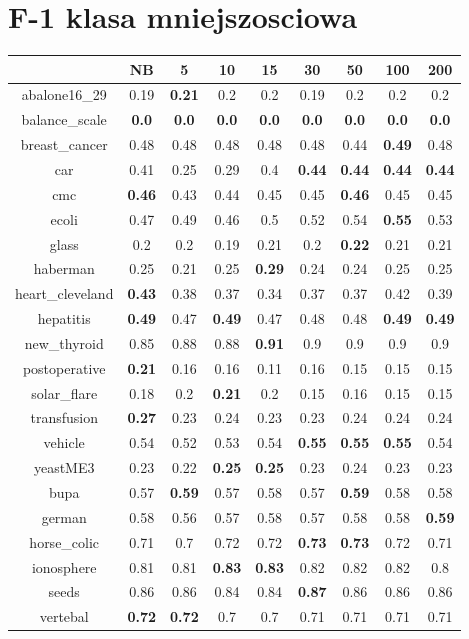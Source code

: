 \documentclass{article}%
\begin{document}
%
\section*{F{-}1 klasa mniejszosciowa}%
\begin{tabular}{c|cccccccc}%
\hline%
&NB&5&10&15&30&50&100&200\\%
\hline%
abalone16\_29&0.19&\textbf{0.21}&0.2&0.2&0.19&0.2&0.2&0.2\\%
\hline%
balance\_scale&\textbf{0.0}&\textbf{0.0}&\textbf{0.0}&\textbf{0.0}&\textbf{0.0}&\textbf{0.0}&\textbf{0.0}&\textbf{0.0}\\%
\hline%
breast\_cancer&0.48&0.48&0.48&0.48&0.48&0.44&\textbf{0.49}&0.48\\%
\hline%
car&0.41&0.25&0.29&0.4&\textbf{0.44}&\textbf{0.44}&\textbf{0.44}&\textbf{0.44}\\%
\hline%
cmc&\textbf{0.46}&0.43&0.44&0.45&0.45&\textbf{0.46}&0.45&0.45\\%
\hline%
ecoli&0.47&0.49&0.46&0.5&0.52&0.54&\textbf{0.55}&0.53\\%
\hline%
glass&0.2&0.2&0.19&0.21&0.2&\textbf{0.22}&0.21&0.21\\%
\hline%
haberman&0.25&0.21&0.25&\textbf{0.29}&0.24&0.24&0.25&0.25\\%
\hline%
heart\_cleveland&\textbf{0.43}&0.38&0.37&0.34&0.37&0.37&0.42&0.39\\%
\hline%
hepatitis&\textbf{0.49}&0.47&\textbf{0.49}&0.47&0.48&0.48&\textbf{0.49}&\textbf{0.49}\\%
\hline%
new\_thyroid&0.85&0.88&0.88&\textbf{0.91}&0.9&0.9&0.9&0.9\\%
\hline%
postoperative&\textbf{0.21}&0.16&0.16&0.11&0.16&0.15&0.15&0.15\\%
\hline%
solar\_flare&0.18&0.2&\textbf{0.21}&0.2&0.15&0.16&0.15&0.15\\%
\hline%
transfusion&\textbf{0.27}&0.23&0.24&0.23&0.23&0.24&0.24&0.24\\%
\hline%
vehicle&0.54&0.52&0.53&0.54&\textbf{0.55}&\textbf{0.55}&\textbf{0.55}&0.54\\%
\hline%
yeastME3&0.23&0.22&\textbf{0.25}&\textbf{0.25}&0.23&0.24&0.23&0.23\\%
\hline%
bupa&0.57&\textbf{0.59}&0.57&0.58&0.57&\textbf{0.59}&0.58&0.58\\%
\hline%
german&0.58&0.56&0.57&0.58&0.57&0.58&0.58&\textbf{0.59}\\%
\hline%
horse\_colic&0.71&0.7&0.72&0.72&\textbf{0.73}&\textbf{0.73}&0.72&0.71\\%
\hline%
ionosphere&0.81&0.81&\textbf{0.83}&\textbf{0.83}&0.82&0.82&0.82&0.8\\%
\hline%
seeds&0.86&0.86&0.84&0.84&\textbf{0.87}&0.86&0.86&0.86\\%
\hline%
vertebal&\textbf{0.72}&\textbf{0.72}&0.7&0.7&0.71&0.71&0.71&0.71\\%
\hline%
\end{tabular}
\end{document}
